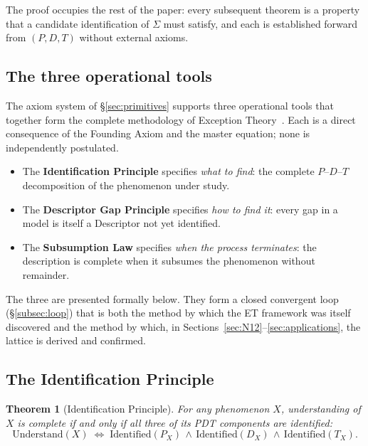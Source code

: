 \documentclass[11pt,a4paper]{article}
\newtheorem{theorem}{Theorem}[section]
\theoremstyle{definition}
\theoremstyle{remark}
\begin{document}
The proof occupies the rest of the paper: every subsequent theorem is a property that a candidate identification of $\Sigma$ must satisfy, and each is established forward from $(P,D,T)$ without external axioms.


\subsection{The three operational tools}\label{subsec:three-tools}

The axiom system of \S\ref{sec:primitives} supports three operational tools that together form the complete methodology of Exception Theory~\cite{ThreeTools}. Each is a direct consequence of the Founding Axiom and the master equation; none is independently postulated.

\begin{itemize}[leftmargin=*]
\item The \textbf{Identification Principle} specifies \emph{what to find}: the complete $P$--$D$--$T$ decomposition of the phenomenon under study.
\item The \textbf{Descriptor Gap Principle} specifies \emph{how to find it}: every gap in a model is itself a Descriptor not yet identified.
\item The \textbf{Subsumption Law} specifies \emph{when the process terminates}: the description is complete when it subsumes the phenomenon without remainder.
\end{itemize}

The three are presented formally below. They form a closed convergent loop (\S\ref{subsec:loop}) that is both the method by which the ET framework was itself discovered and the method by which, in Sections~\ref{sec:N12}--\ref{sec:applications}, the lattice is derived and confirmed.

\subsection{The Identification Principle}\label{subsec:identification}

\begin{theorem}[Identification Principle]\label{thm:identification}
For any phenomenon $X$, understanding of $X$ is complete if and only if all three of its PDT components are identified:
\[
\boxed{\;\mathrm{Understand}(X) \;\iff\; \mathrm{Identified}(P_{X}) \,\land\, \mathrm{Identified}(D_{X}) \,\land\, \mathrm{Identified}(T_{X}).\;}
\]
\end{theorem}
\end{document}

